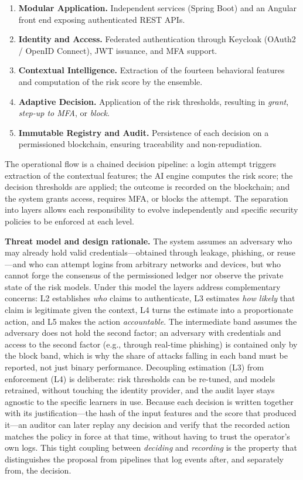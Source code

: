 \documentclass[conference]{IEEEtran}
\begin{document}
\begin{enumerate}
  \item \textbf{Modular Application.} Independent services (Spring
        Boot) and an Angular front end exposing authenticated REST APIs.
  \item \textbf{Identity and Access.} Federated authentication through
        Keycloak (OAuth2 / OpenID Connect), JWT issuance, and MFA
        support.
  \item \textbf{Contextual Intelligence.} Extraction of the fourteen
        behavioral features and computation of the risk score by the
        ensemble.
  \item \textbf{Adaptive Decision.} Application of the risk thresholds,
        resulting in \emph{grant}, \emph{step-up to MFA}, or
        \emph{block}.
  \item \textbf{Immutable Registry and Audit.} Persistence of each
        decision on a permissioned blockchain, ensuring traceability
        and non-repudiation.
\end{enumerate}

The operational flow is a chained decision pipeline: a login attempt
triggers extraction of the contextual features; the AI engine computes
the risk score; the decision thresholds are applied; the outcome is
recorded on the blockchain; and the system grants access, requires MFA,
or blocks the attempt. The separation into layers allows each
responsibility to evolve independently and specific security policies
to be enforced at each level.

\textbf{Threat model and design rationale.} The system assumes an
adversary who may already hold valid credentials---obtained through
leakage, phishing, or reuse---and who can attempt logins from arbitrary
networks and devices, but who cannot forge the consensus of the
permissioned ledger nor observe the private state of the risk models.
Under this model the layers address complementary concerns: L2
establishes \emph{who} claims to authenticate, L3 estimates \emph{how
likely} that claim is legitimate given the context, L4 turns the
estimate into a proportionate action, and L5 makes the action
\emph{accountable}. The intermediate band assumes the adversary does
not hold the second factor; an adversary with credentials and access to
the second factor (e.g., through real-time phishing) is contained only by
the block band, which is why the share of attacks falling in each band
must be reported, not just binary performance. Decoupling estimation (L3) from enforcement (L4) is
deliberate: risk thresholds can be re-tuned, and models retrained,
without touching the identity provider, and the audit layer stays
agnostic to the specific learners in use. Because each decision is
written together with its justification---the hash of the input features
and the score that produced it---an auditor can later replay any
decision and verify that the recorded action matches the policy in force
at that time, without having to trust the operator's own logs. This
tight coupling between \emph{deciding} and \emph{recording} is the
property that distinguishes the proposal from pipelines that log events
after, and separately from, the decision.
\end{document}
